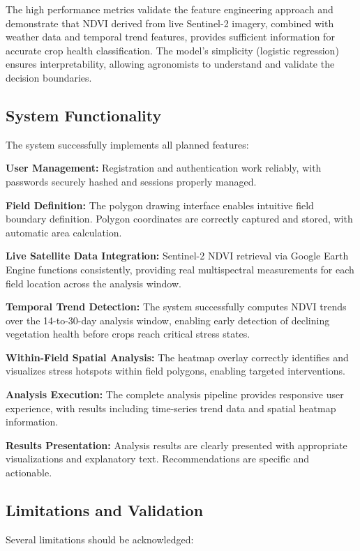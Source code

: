 \documentclass[journal]{IEEEtran}
\begin{document}
The high performance metrics validate the feature engineering approach and demonstrate that NDVI derived from live Sentinel-2 imagery, combined with weather data and temporal trend features, provides sufficient information for accurate crop health classification. The model's simplicity (logistic regression) ensures interpretability, allowing agronomists to understand and validate the decision boundaries.

\subsection{System Functionality}

The system successfully implements all planned features:

\textbf{User Management:} Registration and authentication work reliably, with passwords securely hashed and sessions properly managed.

\textbf{Field Definition:} The polygon drawing interface enables intuitive field boundary definition. Polygon coordinates are correctly captured and stored, with automatic area calculation.

\textbf{Live Satellite Data Integration:} Sentinel-2 NDVI retrieval via Google Earth Engine functions consistently, providing real multispectral measurements for each field location across the analysis window.

\textbf{Temporal Trend Detection:} The system successfully computes NDVI trends over the 14-to-30-day analysis window, enabling early detection of declining vegetation health before crops reach critical stress states.

\textbf{Within-Field Spatial Analysis:} The heatmap overlay correctly identifies and visualizes stress hotspots within field polygons, enabling targeted interventions.

\textbf{Analysis Execution:} The complete analysis pipeline provides responsive user experience, with results including time-series trend data and spatial heatmap information.

\textbf{Results Presentation:} Analysis results are clearly presented with appropriate visualizations and explanatory text. Recommendations are specific and actionable.

\subsection{Limitations and Validation}

Several limitations should be acknowledged:
\end{document}
